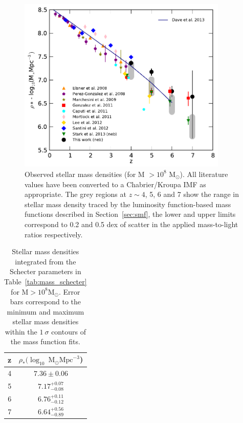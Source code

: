 \begin{figure}
\centering
\includegraphics[width=100mm]{plots/fig12.pdf}
\caption[Observed stellar mass densities (for M $>10^8$ M$_{\odot}$).]{Observed stellar mass densities (for M $>10^8$ M$_{\odot}$). All literature values have been converted to a Chabrier/Kroupa IMF as appropriate. The grey regions at $z \sim 4$, 5, 6 and 7 show the range in stellar mass density traced by the luminosity function-based mass functions described in Section~\ref{sec:smf}, the lower and upper limits correspond to 0.2 and 0.5 dex of scatter in the applied mass-to-light ratios respectively.}
\label{fig:smd_evolution}
\end{figure}


\begin{table}
\centering
\caption[Stellar mass densities integrated from the Schecter parameters in Table~\ref{tab:mass_schecter} for $\text{M} > 10^8 \text{M}_{\odot}$.]{Stellar mass densities integrated from the Schecter parameters in Table~\ref{tab:mass_schecter} for $\text{M} > 10^8 \text{M}_{\odot}$. Error bars correspond to the minimum and maximum stellar mass densities within the $1~\sigma$ contours of the mass function fits.}
\begin{tabular}{c c}
\hline
z & $\rho_{*} (\log_{10}~\text{M}_{\odot} \text{Mpc}^{-3}$)\\
\hline
4 & $7.36\pm0.06$ \\
5 & $7.17^{+0.07}_{-0.08}$ \\
6 & $6.76^{+0.11}_{-0.12}$ \\
7 & $6.64^{+0.56}_{-0.89}$ \\
\hline
\end{tabular}\label{tab:smd}
\end{table}

